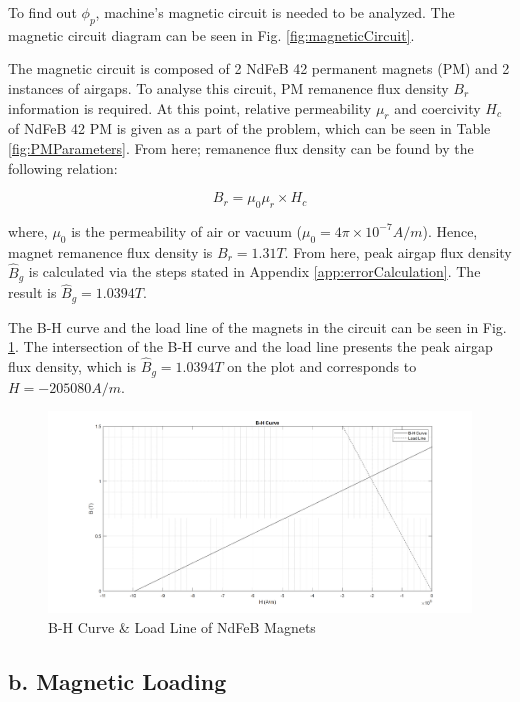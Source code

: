 \documentclass[a4paper, 11pt, titlepage]{article}
\begin{document}
To find out $\phi_p$, machine's magnetic circuit is needed to be analyzed. The magnetic circuit diagram can be seen in Fig. \ref{fig:magneticCircuit}. 

The magnetic circuit is composed of 2 NdFeB 42 permanent magnets (PM) and 2 instances of airgaps. To analyse this circuit, PM remanence flux density $B_r$ information is required. At this point, relative permeability $\mu_r$ and coercivity $H_c$ of NdFeB 42 PM is given as a part of the problem, which can be seen in Table \ref{fig:PMParameters}. From here; remanence flux density can be found by the following relation:

\begin{equation}
	B_r = \mu_0\mu_r\times H_c 
	\label{label:remanenceFluxDensity}
\end{equation}

where, $\mu_0$ is the permeability of air or vacuum ($\mu_0=4\pi \times 10^{-7}A/m$). Hence, magnet remanence flux density  is $B_r=1.31 T$. From here, peak airgap flux density $\hat{B}_g$ is calculated via the steps stated in Appendix \ref{app:errorCalculation}. The result is $\hat{B}_g=1.0394T$.

The B-H curve and the load line of the magnets in the circuit can be seen in Fig. \ref{fig:BHCurve}. The intersection of the B-H curve and the load line presents the peak airgap flux density, which is $\hat{B}_g=1.0394T$ on the plot and corresponds to $H=-205080A/m$.

\begin{figure}[h]
	\includegraphics[width=\textwidth]{BHCurve.png}
	\caption{B-H Curve \& Load Line of NdFeB Magnets}
	\label{fig:BHCurve}
\end{figure}



\subsection{b. Magnetic Loading}
\label{sec:specificMagneticLoading}
\end{document}
